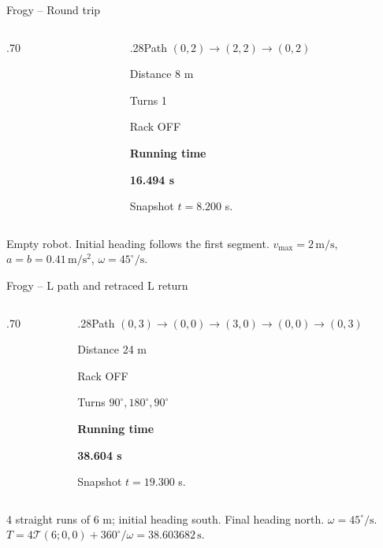 \begin{frame}{Frogy -- Round trip}
\begin{columns}[T,onlytextwidth]
\begin{column}{.70\textwidth}\end{column}
\begin{column}{.28\textwidth}\small Path $(0,2)\to(2,2)\to(0,2)$\par\medskip Distance 8 m\par Turns 1\par Rack OFF\par\medskip\textbf{Running time}\par\textbf{16.494 s}\par\medskip Snapshot $t=8.200$ s.\end{column}
\end{columns}
\vspace{1mm}
{\tiny\texttt{}\par \texttt{}\par Empty robot. Initial heading follows the first segment. $v_{\max}=2\,\mathrm{m/s}$, $a=b=0.41\,\mathrm{m/s^2}$, $\omega=45^\circ/\mathrm{s}$.}
\end{frame}



\begin{frame}{Frogy -- L path and retraced L return}
\begin{columns}[T,onlytextwidth]
\begin{column}{.70\textwidth}\end{column}
\begin{column}{.28\textwidth}\small Path $(0,3)\to(0,0)\to(3,0)\to(0,0)\to(0,3)$\par\medskip Distance 24 m\par Rack OFF\par Turns $90^\circ,180^\circ,90^\circ$\par\medskip\textbf{Running time}\par\textbf{38.604 s}\par\medskip Snapshot $t=19.300$ s.\end{column}
\end{columns}
\vspace{1mm}
{\tiny\texttt{}\par
\texttt{}\par
4 straight runs of 6 m; initial heading south. Final heading north. $\omega=45^\circ/\mathrm{s}$. $T=4\mathcal T(6;0,0)+360^\circ/\omega=38.603682\,\mathrm{s}$.}
\end{frame}

